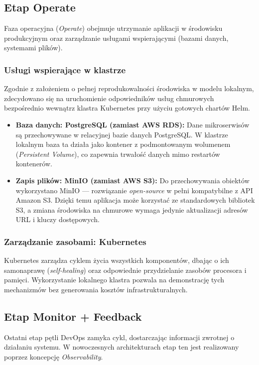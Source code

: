 \subsection{Etap Operate}
Faza operacyjna (\textit{Operate}) obejmuje utrzymanie aplikacji w środowisku produkcyjnym oraz zarządzanie usługami wspierającymi (bazami danych, systemami plików).

\subsubsection{Usługi wspierające w klastrze}
Zgodnie z założeniem o pełnej reprodukowalności środowiska w modelu lokalnym, zdecydowano się na uruchomienie odpowiedników usług chmurowych bezpośrednio wewnątrz klastra Kubernetes przy użyciu gotowych chartów Helm.
\begin{itemize}
    \item \textbf{Baza danych: PostgreSQL (zamiast AWS RDS):} Dane mikroserwisów są przechowywane w relacyjnej bazie danych PostgreSQL. W klastrze lokalnym baza ta działa jako kontener z podmontowanym wolumenem (\textit{Persistent Volume}), co zapewnia trwałość danych mimo restartów kontenerów.
    \item \textbf{Zapis plików: MinIO (zamiast AWS S3):} Do przechowywania obiektów wykorzystano MinIO — rozwiązanie \textit{open-source} w pełni kompatybilne z API Amazon S3. Dzięki temu aplikacja może korzystać ze standardowych bibliotek S3, a zmiana środowiska na chmurowe wymaga jedynie aktualizacji adresów URL i kluczy dostępowych.
\end{itemize}

\subsubsection{Zarządzanie zasobami: Kubernetes}
Kubernetes zarządza cyklem życia wszystkich komponentów, dbając o ich samonaprawę (\textit{self-healing}) oraz odpowiednie przydzielanie zasobów procesora i pamięci. Wykorzystanie lokalnego klastra pozwala na demonstrację tych mechanizmów bez generowania kosztów infrastrukturalnych.

\subsection{Etap Monitor + Feedback}
Ostatni etap pętli DevOps zamyka cykl, dostarczając informacji zwrotnej o działaniu systemu. W nowoczesnych architekturach etap ten jest realizowany poprzez koncepcję \textit{Observability}.

